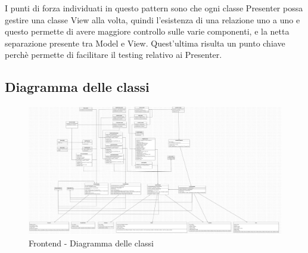 I punti di forza individuati in questo pattern sono che ogni classe Presenter possa gestire 
una classe View alla volta, quindi l'esistenza di una relazione uno a uno e questo permette di avere maggiore 
controllo sulle varie componenti, e la netta separazione presente tra Model e View. 
Quest'ultima risulta un punto chiave perchè permette di facilitare il testing relativo ai Presenter.

\subsection{Diagramma delle classi}
\begin{figure}[!h]
    \includegraphics[width=16cm]{sezioni/images/Main.jpg}
    \centering
    \caption{Frontend - Diagramma delle classi}
\end{figure}

